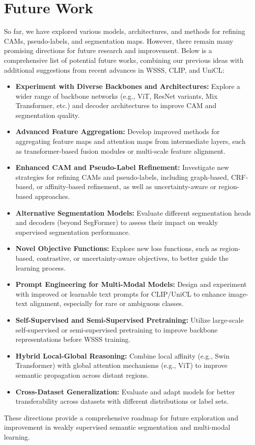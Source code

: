 \section{Future Work}
\label{sec:future}


So far, we have explored various models, architectures, and methods for refining CAMs, pseudo-labels, and segmentation maps. However, there remain many promising directions for future research and improvement. Below is a comprehensive list of potential future works, combining our previous ideas with additional suggestions from recent advances in WSSS, CLIP, and UniCL:

\begin{itemize}
    \item \textbf{Experiment with Diverse Backbones and Architectures:} Explore a wider range of backbone networks (e.g., ViT, ResNet variants, Mix Transformer, etc.) and decoder architectures to improve CAM and segmentation quality.
    \item \textbf{Advanced Feature Aggregation:} Develop improved methods for aggregating feature maps and attention maps from intermediate layers, such as transformer-based fusion modules or multi-scale feature alignment.
    \item \textbf{Enhanced CAM and Pseudo-Label Refinement:} Investigate new strategies for refining CAMs and pseudo-labels, including graph-based, CRF-based, or affinity-based refinement, as well as uncertainty-aware or region-based approaches.
    \item \textbf{Alternative Segmentation Models:} Evaluate different segmentation heads and decoders (beyond SegFormer) to assess their impact on weakly supervised segmentation performance.
    \item \textbf{Novel Objective Functions:} Explore new loss functions, such as region-based, contrastive, or uncertainty-aware objectives, to better guide the learning process.
    \item \textbf{Prompt Engineering for Multi-Modal Models:} Design and experiment with improved or learnable text prompts for CLIP/UniCL to enhance image-text alignment, especially for rare or ambiguous classes.
    \item \textbf{Self-Supervised and Semi-Supervised Pretraining:} Utilize large-scale self-supervised or semi-supervised pretraining to improve backbone representations before WSSS training.
    \item \textbf{Hybrid Local-Global Reasoning:} Combine local affinity (e.g., Swin Transformer) with global attention mechanisms (e.g., ViT) to improve semantic propagation across distant regions.
    \item \textbf{Cross-Dataset Generalization:} Evaluate and adapt models for better transferability across datasets with different distributions or label sets.
\end{itemize}

These directions provide a comprehensive roadmap for future exploration and improvement in weakly supervised semantic segmentation and multi-modal learning.